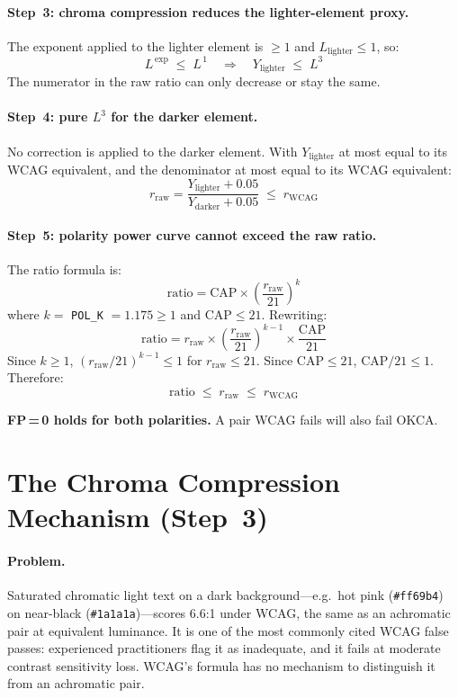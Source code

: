 \documentclass[11pt,a4paper]{article}
\begin{document}
\paragraph{Step~3: chroma compression reduces the lighter-element proxy.}

The exponent applied to the lighter element is $\ge 1$ and
$L_{\text{lighter}} \le 1$, so:
\[
  L^{\,\text{exp}} \;\le\; L^{\,1}
  \quad\Rightarrow\quad
  Y_{\text{lighter}} \;\le\; L^3
\]
The numerator in the raw ratio can only decrease or stay the same.

\paragraph{Step~4: pure $L^3$ for the darker element.}

No correction is applied to the darker element.  With
$Y_{\text{lighter}}$ at most equal to its WCAG equivalent, and the
denominator at most equal to its WCAG equivalent:
\[
  r_{\text{raw}} = \frac{Y_{\text{lighter}} + 0.05}{Y_{\text{darker}} + 0.05}
  \;\le\; r_{\text{WCAG}}
\]

\paragraph{Step~5: polarity power curve cannot exceed the raw ratio.}

The ratio formula is:
\[
  \text{ratio} = \text{CAP} \times \left(\frac{r_{\text{raw}}}{21}\right)^{\!k}
\]
where $k =$ \texttt{POL\_K} $= 1.175 \ge 1$ and $\text{CAP} \le 21$.
Rewriting:
\[
  \text{ratio}
  = r_{\text{raw}}
    \times \left(\frac{r_{\text{raw}}}{21}\right)^{\!k-1}
    \times \frac{\text{CAP}}{21}
\]
Since $k \ge 1$, $(r_{\text{raw}}/21)^{k-1} \le 1$ for
$r_{\text{raw}} \le 21$.  Since $\text{CAP} \le 21$,
$\text{CAP}/21 \le 1$.  Therefore:
\[
  \text{ratio} \;\le\; r_{\text{raw}} \;\le\; r_{\text{WCAG}}
\]

\textbf{FP\,=\,0 holds for both polarities.}  A pair WCAG fails will
also fail OKCA.

\section{The Chroma Compression Mechanism (Step~3)}
\label{sec:chroma}

\paragraph{Problem.}
Saturated chromatic light text on a dark background---e.g.\ hot pink
(\texttt{\#ff69b4}) on near-black (\texttt{\#1a1a1a})---scores 6.6:1
under WCAG, the same as an achromatic pair at equivalent luminance.
It is one of the most commonly cited WCAG false passes: experienced
practitioners flag it as inadequate, and it fails at moderate contrast
sensitivity loss.  WCAG's formula has no mechanism to distinguish it
from an achromatic pair.
\end{document}

